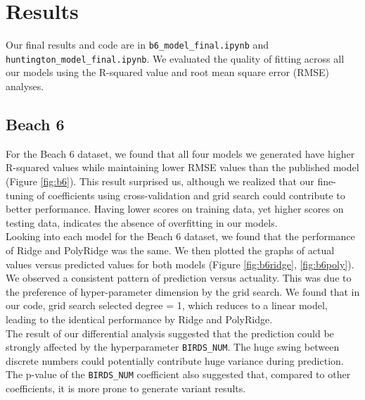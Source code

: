 
\section{Results}
\label{sec:results}

Our final results and code are in \texttt{b6\_model\_final.ipynb} and \texttt{huntington\_model\_final.ipynb}. We evaluated the quality of fitting across all our models using the R-squared value and root mean square error (RMSE) analyses.
\subsection{Beach 6}
For the Beach 6 dataset, we found that all four models we generated have higher R-squared values while maintaining lower RMSE values than the published model (Figure \ref{fig:b6}). This result surprised us, although we realized that our fine-tuning of coefficients using cross-validation and grid search could contribute to better performance. Having lower scores on training data, yet higher scores on testing data, indicates the absence of overfitting in our models.\\
Looking into each model for the Beach 6 dataset, we found that the performance of Ridge and PolyRidge was the same. We then plotted the graphs of actual values versus predicted values for both models (Figure \ref{fig:b6ridge}, \ref{fig:b6poly}). We observed a consistent pattern of prediction versus actuality. This was due to the preference of hyper-parameter dimension by the grid search. We found that in our code, grid search selected degree = 1, which reduces to a linear model, leading to the identical performance by Ridge and PolyRidge.\\
The result of our differential analysis suggested that the prediction could be strongly affected by the hyperparameter \texttt{BIRDS\_NUM}. The huge swing between discrete numbers could potentially contribute huge variance during prediction. The p-value of the \texttt{BIRDS\_NUM} coefficient also suggested that, compared to other coefficients, it is more prone to generate variant results.
